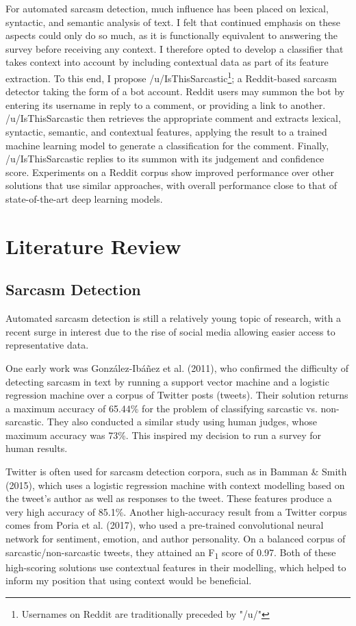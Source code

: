 \documentclass[a4paper,12pt]{article}
\begin{document}
For automated sarcasm detection, much influence has been placed on lexical, syntactic, and semantic analysis of text. I felt that continued emphasis on these aspects could only do so much, as it is functionally equivalent to answering the survey before receiving any context. I therefore opted to develop a classifier that takes context into account by including contextual data as part of its feature extraction. To this end, I propose /u/IsThisSarcastic\footnote{Usernames on Reddit are traditionally preceded by "/u/"}; a Reddit-based sarcasm detector taking the form of a bot account. Reddit users may summon the bot by entering its username in reply to a comment, or providing a link to another. /u/IsThisSarcastic then retrieves the appropriate comment and extracts lexical, syntactic, semantic, and contextual features, applying the result to a trained machine learning model to generate a classification for the comment. Finally, /u/IsThisSarcastic replies to its summon with its judgement and confidence score. Experiments on a Reddit corpus show improved performance over other solutions that use similar approaches, with overall performance close to that of state-of-the-art deep learning models.


\section{Literature Review}
\subsection{Sarcasm Detection}
Automated sarcasm detection is still a relatively young topic of research, with a recent surge in interest due to the rise of social media allowing easier access to representative data. 

One early work was González-Ibáñez et al. (2011), who confirmed the difficulty of detecting sarcasm in text by running a support vector machine and a logistic regression machine over a corpus of Twitter posts (tweets). Their solution returns a maximum accuracy of 65.44\% for the problem of classifying sarcastic vs. non-sarcastic. They also conducted a similar study using human judges, whose maximum accuracy was 73\%. This inspired my decision to run a survey for human results.

Twitter is often used for sarcasm detection corpora, such as in Bamman \& Smith (2015), which uses a logistic regression machine with context modelling based on the tweet's author as well as responses to the tweet. These features produce a very high accuracy of 85.1\%. Another high-accuracy result from a Twitter corpus comes from Poria et al. (2017), who used a pre-trained convolutional neural network for sentiment, emotion, and author personality. On a balanced corpus of sarcastic/non-sarcastic tweets, they attained an F\textsubscript{1} score of 0.97. Both of these high-scoring solutions use contextual features in their modelling, which helped to inform my position that using context would be beneficial.
\end{document}
